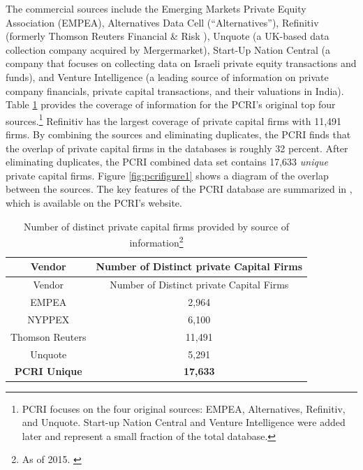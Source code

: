 \documentclass[
]{book}
\begin{document}
The commercial sources include the Emerging Markets Private Equity Association (EMPEA), Alternatives Data Cell (``Alternatives''), Refinitiv (formerly Thomson Reuters Financial \& Risk ), Unquote (a UK-based data collection company acquired by Mergermarket), Start-Up Nation Central (a company that focuses on collecting data on Israeli private equity transactions and funds), and Venture Intelligence (a leading source of information on private company financials, private capital transactions, and their valuations in India). Table \ref{tab:pcritable1} provides the coverage of information for the PCRI's original top four sources.\footnote{PCRI focuses on the four original sources: EMPEA, Alternatives, Refinitiv, and Unquote. Start-up Nation Central and Venture Intelligence were added later and represent a small fraction of the total database.} Refinitiv has the largest coverage of private capital firms with 11,491 firms. By combining the sources and eliminating duplicates, the PCRI finds that the overlap of private capital firms in the databases is roughly 32 percent. After eliminating duplicates, the PCRI combined data set contains 17,633 \emph{unique} private capital firms. Figure \ref{fig:pcrifigure1} shows a diagram of the overlap between the sources. The key features of the PCRI database are summarized in \citep{jeng2015}, which is available on the PCRI's website.

\begin{longtable}[]{@{}cc@{}}
\caption[\label{tab:pcritable1} Number of distinct private capital firms provided by source of information]{\label{tab:pcritable1} Number of distinct private capital firms provided by source of information\footnote{As of 2015. \citep{jeng2015}}}\tabularnewline
\toprule
Vendor & Number of Distinct private Capital Firms\tabularnewline
\midrule
\endfirsthead
\toprule
Vendor & Number of Distinct private Capital Firms\tabularnewline
\midrule
\endhead
EMPEA & 2,964\tabularnewline
NYPPEX & 6,100\tabularnewline
Thomson Reuters & 11,491\tabularnewline
Unquote & 5,291\tabularnewline
\textbf{PCRI Unique} & \textbf{17,633}\tabularnewline
\bottomrule
\end{longtable}
\end{document}
